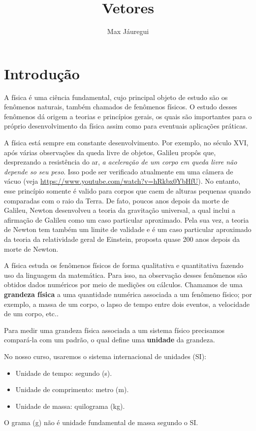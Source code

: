 \documentclass[12pt, a4paper]{article}
\title{Vetores}
\author{Max Jáuregui}
\begin{document}
\maketitle

\section{Introdução}

A física é uma ciência fundamental, cujo principal objeto de estudo são os fenômenos naturais, também chamados de fenômenos físicos. O estudo desses fenômenos dá origem a teorias e princípios gerais, os quais são importantes para o próprio desenvolvimento da física assim como para eventuais aplicações práticas. 

A física está sempre em constante desenvolvimento. Por exemplo, no século XVI, após várias observações da queda livre de objetos, Galileu propôs que, desprezando a resistência do ar, \textit{a aceleração de um corpo em queda livre não depende so seu peso}. Isso pode ser verificado atualmente em uma câmera de vácuo (veja \url{https://www.youtube.com/watch?v=hRkbx0YbHfU}). No entanto, esse princípio somente é valido para corpos que caem de alturas pequenas quando comparadas com o raio da Terra. De fato, poucos anos depois da morte de Galileu, Newton desenvolveu a teoria da gravitação universal, a qual inclui a afirmação de Galileu como um caso particular aproximado. Pela sua vez, a teoria de Newton tem também um limite de validade e é um caso particular aproximado da teoria da relatividade geral de Einstein, proposta quase 200 anos depois da morte de Newton. 

A física estuda os fenômenos físicos de forma qualitativa e quantitativa fazendo uso da linguagem da matemática. Para isso, na observação desses fenômenos são obtidos dados numéricos por meio de medições ou cálculos. Chamamos de uma \textbf{grandeza física} a uma quantidade numérica associada a um fenômeno físico; por exemplo, a massa de um corpo, o lapso de tempo entre dois eventos, a velocidade de um corpo, etc..

Para medir uma grandeza física associada a um sistema físico precisamos compará-la com um padrão, o qual define uma \textbf{unidade} da grandeza.

No nosso curso, usaremos o sistema internacional de unidades (SI):
\begin{itemize}
	\item Unidade de tempo: segundo (s).
	\item Unidade de comprimento: metro (m).
	\item Unidade de massa: quilograma (kg). 
\end{itemize}
O grama (g) não é unidade fundamental de massa segundo o SI.
\end{document}
